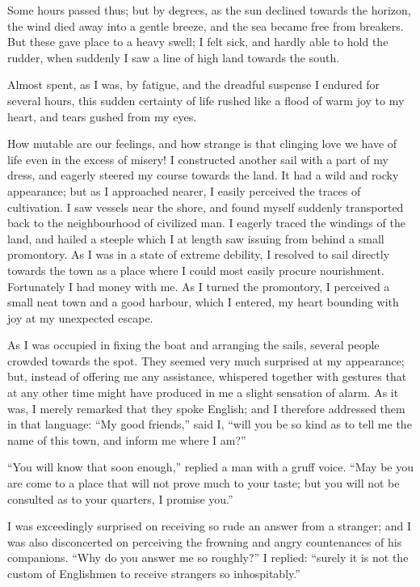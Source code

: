 Some hours passed thus; but by degrees,
as the sun declined towards the
horizon, the wind died away into a
gentle breeze, and the sea became free
from breakers. But these gave place
to a heavy swell; I felt sick, and hardly
able to hold the rudder, when suddenly
I saw a line of high land towards the
south.

Almost spent, as I was, by fatigue,
and the dreadful suspense I endured
for several hours, this sudden certainty
of life rushed like a flood of warm joy
to my heart, and tears gushed from my
eyes.

How mutable are our feelings, and
how strange is that clinging love we
have of life even in the excess of misery!
I constructed another sail with
a part of my dress, and eagerly steered
my course towards the land. It had a
wild and rocky appearance; but as I
approached nearer, I easily perceived
the traces of cultivation. I saw vessels
near the shore, and found myself
suddenly transported back to the neighbourhood
of civilized man. I eagerly
traced the windings of the land, and
hailed a steeple which I at length saw
issuing from behind a small promontory.
As I was in a state of extreme
debility, I resolved to sail directly towards
the town as a place where I
could most easily procure nourishment.
Fortunately I had money with me. As
I turned the promontory, I perceived a
small neat town and a good harbour,
which I entered, my heart bounding
with joy at my unexpected escape.

As I was occupied in fixing the boat
and arranging the sails, several people
crowded towards the spot. They seem\-ed
very much surprised at my appearance;
but, instead of offering me any assistance,
whispered together with gestures
that at any other time might have produced
in me a slight sensation of alarm.
As it was, I merely remarked that they
spoke English; and I therefore addressed
them in that language: ``My
good friends,'' said I, ``will you be so
kind as to tell me the name of this
town, and inform me where I am?''

``You will know that soon enough,''
replied a man with a gruff voice.
``May be you are come to a place that
will not prove much to your taste; but
you will not be consulted as to your
quarters, I promise you.''

I was exceedingly surprised on receiving
so rude an answer from a
stranger; and I was also disconcerted
on perceiving the frowning and angry
countenances of his companions. ``Why
do you answer me so roughly?'' I replied:
``surely it is not the custom of
Englishmen to receive strangers so inhospitably.''

